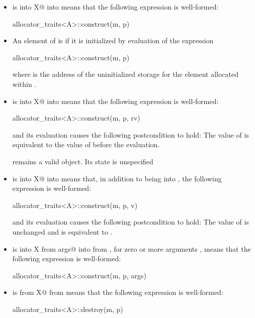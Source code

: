 \begin{itemize}
\item
{} is 
{ into X@ into }
means that the following expression is well-formed:
\begin{codeblock}
allocator_traits<A>::construct(m, p)
\end{codeblock}

\item
An element of  is  if it is initialized
by evaluation of the expression
\begin{codeblock}
allocator_traits<A>::construct(m, p)
\end{codeblock}
where  is the address of the uninitialized storage for the element
allocated within .

\item
{} is 
{ into X@ into }
means that the following expression
is well-formed:
\begin{codeblock}
allocator_traits<A>::construct(m, p, rv)
\end{codeblock}
and its evaluation causes the following postcondition to hold: The value
of  is equivalent to the value of  before the evaluation.
\begin{note}  remains a valid object. Its state is unspecified \end{note}

\item
{} is 
{ into X@ into }
means that, in addition to  being  into
, the following expression is well-formed:
\begin{codeblock}
allocator_traits<A>::construct(m, p, v)
\end{codeblock}
and its evaluation causes the following postcondition to hold:
The value of  is unchanged and is equivalent to .

\item
{} is
{ into X from args@ into  from },
for zero
or more arguments , means that the following expression is well-formed:
\begin{codeblock}
allocator_traits<A>::construct(m, p, args)
\end{codeblock}

\item
{} is
{ from X@ from }
means that the following expression is well-formed:
\begin{codeblock}
allocator_traits<A>::destroy(m, p)
\end{codeblock}
\end{itemize}

